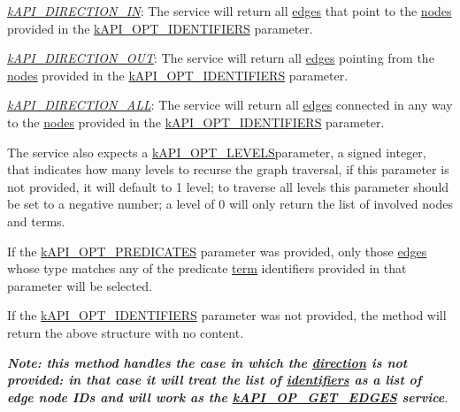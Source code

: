 \begin{DoxyItemize}
\item {\itshape \hyperlink{}{k\-A\-P\-I\-\_\-\-D\-I\-R\-E\-C\-T\-I\-O\-N\-\_\-\-I\-N}}\-: The service will return all \hyperlink{class_c_ontology_edge}{edges} that point to the \hyperlink{class_c_ontology_node}{nodes} provided in the \hyperlink{}{k\-A\-P\-I\-\_\-\-O\-P\-T\-\_\-\-I\-D\-E\-N\-T\-I\-F\-I\-E\-R\-S} parameter. 
\item {\itshape \hyperlink{}{k\-A\-P\-I\-\_\-\-D\-I\-R\-E\-C\-T\-I\-O\-N\-\_\-\-O\-U\-T}}\-: The service will return all \hyperlink{class_c_ontology_edge}{edges} pointing from the \hyperlink{class_c_ontology_node}{nodes} provided in the \hyperlink{}{k\-A\-P\-I\-\_\-\-O\-P\-T\-\_\-\-I\-D\-E\-N\-T\-I\-F\-I\-E\-R\-S} parameter. 
\item {\itshape \hyperlink{}{k\-A\-P\-I\-\_\-\-D\-I\-R\-E\-C\-T\-I\-O\-N\-\_\-\-A\-L\-L}}\-: The service will return all \hyperlink{class_c_ontology_edge}{edges} connected in any way to the \hyperlink{class_c_ontology_node}{nodes} provided in the \hyperlink{}{k\-A\-P\-I\-\_\-\-O\-P\-T\-\_\-\-I\-D\-E\-N\-T\-I\-F\-I\-E\-R\-S} parameter. 
\end{DoxyItemize}

The service also expects a \hyperlink{}{k\-A\-P\-I\-\_\-\-O\-P\-T\-\_\-\-L\-E\-V\-E\-L\-S}parameter, a signed integer, that indicates how many levels to recurse the graph traversal, if this parameter is not provided, it will default to 1 level; to traverse all levels this parameter should be set to a negative number; a level of 0 will only return the list of involved nodes and terms.

If the \hyperlink{}{k\-A\-P\-I\-\_\-\-O\-P\-T\-\_\-\-P\-R\-E\-D\-I\-C\-A\-T\-E\-S} parameter was provided, only those \hyperlink{class_c_ontology_edge}{edges} whose type matches any of the predicate \hyperlink{class_c_ontology_term}{term} identifiers provided in that parameter will be selected.

If the \hyperlink{}{k\-A\-P\-I\-\_\-\-O\-P\-T\-\_\-\-I\-D\-E\-N\-T\-I\-F\-I\-E\-R\-S} parameter was not provided, the method will return the above structure with no content.

{\bfseries {\itshape Note\-: this method handles the case in which the \hyperlink{}{direction} is not provided\-: in that case it will treat the list of \hyperlink{}{identifiers} as a list of edge node I\-Ds and will work as the \hyperlink{}{k\-A\-P\-I\-\_\-\-O\-P\-\_\-\-G\-E\-T\-\_\-\-E\-D\-G\-E\-S} service}}.

